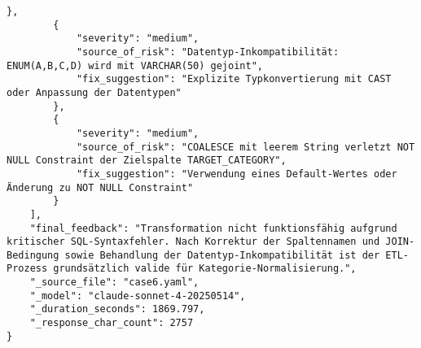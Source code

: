 \begin{lstlisting}[caption={Ausgabe: Claude Sonnet 4 Anwendungsfall 6 Konsistenzdurchlauf},label={claude_case6_prompt2}]
        },
        {
            "severity": "medium",
            "source_of_risk": "Datentyp-Inkompatibilität: ENUM(A,B,C,D) wird mit VARCHAR(50) gejoint",
            "fix_suggestion": "Explizite Typkonvertierung mit CAST oder Anpassung der Datentypen"
        },
        {
            "severity": "medium",
            "source_of_risk": "COALESCE mit leerem String verletzt NOT NULL Constraint der Zielspalte TARGET_CATEGORY",
            "fix_suggestion": "Verwendung eines Default-Wertes oder Änderung zu NOT NULL Constraint"
        }
    ],
    "final_feedback": "Transformation nicht funktionsfähig aufgrund kritischer SQL-Syntaxfehler. Nach Korrektur der Spaltennamen und JOIN-Bedingung sowie Behandlung der Datentyp-Inkompatibilität ist der ETL-Prozess grundsätzlich valide für Kategorie-Normalisierung.",
    "_source_file": "case6.yaml",
    "_model": "claude-sonnet-4-20250514",
    "_duration_seconds": 1869.797,
    "_response_char_count": 2757
}
\end{lstlisting}

